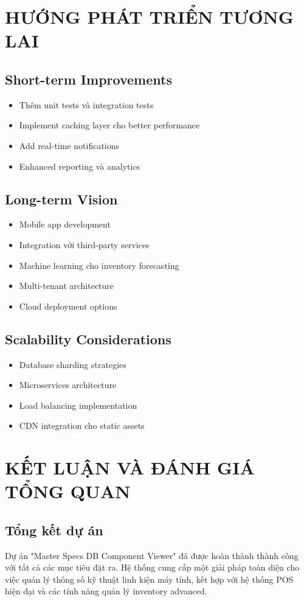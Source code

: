 \documentclass[12pt,a4paper]{article}
\begin{document}
\section{HƯỚNG PHÁT TRIỂN TƯƠNG LAI}

\subsection{Short-term Improvements}
\begin{itemize}
    \item Thêm unit tests và integration tests
    \item Implement caching layer cho better performance
    \item Add real-time notifications
    \item Enhanced reporting và analytics
\end{itemize}

\subsection{Long-term Vision}
\begin{itemize}
    \item Mobile app development
    \item Integration với third-party services
    \item Machine learning cho inventory forecasting
    \item Multi-tenant architecture
    \item Cloud deployment options
\end{itemize}

\subsection{Scalability Considerations}
\begin{itemize}
    \item Database sharding strategies
    \item Microservices architecture
    \item Load balancing implementation
    \item CDN integration cho static assets
\end{itemize}

\section{KẾT LUẬN VÀ ĐÁNH GIÁ TỔNG QUAN}

\subsection{Tổng kết dự án}
Dự án "Master Specs DB Component Viewer" đã được hoàn thành thành công với tất cả các mục tiêu đặt ra. Hệ thống cung cấp một giải pháp toàn diện cho việc quản lý thông số kỹ thuật linh kiện máy tính, kết hợp với hệ thống POS hiện đại và các tính năng quản lý inventory advanced.
\end{document}
